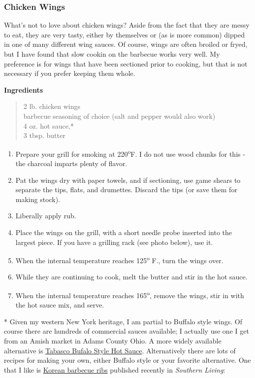 \documentclass[
]{book}
\providecommand{\tightlist}{%
  \setlength{\itemsep}{0pt}\setlength{\parskip}{0pt}}
\begin{document}
\hypertarget{chicken-wings}{%
\subsubsection{Chicken Wings}\label{chicken-wings}}

What's not to love about chicken wings? Aside from the fact that they are messy to eat, they are very tasty, either by themselves or (as is more common) dipped in one of many different wing sauces. Of course, wings are often broiled or fryed, but I have found that slow cookin on the barbecue works very well. My preference is for wings that have been sectioned prior to cooking, but that is not necessary if you prefer keeping them whole.

\textbf{Ingredients}

\begin{quote}
2 lb. chicken wings\\
barbecue seasoning of choice (salt and pepper would also work)\\
4 oz. hot sauce,*\\
3 tbsp. butter
\end{quote}

\begin{enumerate}
\def\labelenumi{\arabic{enumi}.}
\tightlist
\item
  Prepare your grill for smoking at 220\textsuperscript{o}F. I do not use wood chunks for this - the charcoal imparts plenty of flavor.
\item
  Pat the wings dry with paper towels, and if sectioning, use game shears to separate the tips, flats, and drumettes. Discard the tips (or save them for making stock).
\item
  Liberally apply rub.
\item
  Place the wings on the grill, with a short needle probe inserted into the largest piece. If you have a grilling rack (see photo below), use it.
\item
  When the internal temperature reaches 125\textsuperscript{o} F., turn the wings over.
\item
  While they are continuing to cook, melt the butter and stir in the hot sauce.
\item
  When the internal temperature reaches 165\textsuperscript{o}, remove the wings, stir in with the hot sauce mix, and serve.
\end{enumerate}

* Given my western New York heritage, I am partial to Buffalo style wings. Of course there are hundreds of commercial sauces available; I actually use one I get from an Amish market in Adams County Ohio. A more widely available alternative is \href{https://www.tabasco.com/hot-sauces/buffalo-style-hot-sauce/}{Tabasco Bufalo Style Hot Sauce}. Alternatively there are lots of recipes for making your own, either Buffalo style or your favorite alternative. One that I like is \href{https://www.tabasco.com/hot-sauces/buffalo-style-hot-sauce/}{Korean barbecue ribs} published recently in \emph{Southern Living}:
\end{document}
